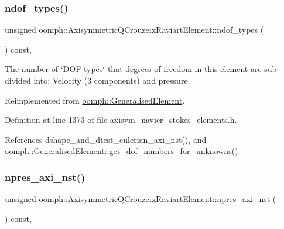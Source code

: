 \subsubsection{\texorpdfstring{ndof\+\_\+types()}{ndof\_types()}}
{\footnotesize\ttfamily unsigned oomph\+::\+Axisymmetric\+Q\+Crouzeix\+Raviart\+Element\+::ndof\+\_\+types (\begin{DoxyParamCaption}{ }\end{DoxyParamCaption}) const\hspace{0.3cm}{\ttfamily [inline]}, {\ttfamily [virtual]}}



The number of \char`\"{}\+D\+O\+F types\char`\"{} that degrees of freedom in this element are sub-\/divided into\+: Velocity (3 components) and pressure. 



Reimplemented from \hyperlink{classoomph_1_1GeneralisedElement_a0c6037a870597b35dcf1c780710b9a56}{oomph\+::\+Generalised\+Element}.



Definition at line 1373 of file axisym\+\_\+navier\+\_\+stokes\+\_\+elements.\+h.



References dshape\+\_\+and\+\_\+dtest\+\_\+eulerian\+\_\+axi\+\_\+nst(), and oomph\+::\+Generalised\+Element\+::get\+\_\+dof\+\_\+numbers\+\_\+for\+\_\+unknowns().

\mbox{\label{classoomph_1_1AxisymmetricQCrouzeixRaviartElement_a923c2ccbc5bd523118273e63cc18fd5f}} 
\subsubsection{\texorpdfstring{npres\+\_\+axi\+\_\+nst()}{npres\_axi\_nst()}}
{\footnotesize\ttfamily unsigned oomph\+::\+Axisymmetric\+Q\+Crouzeix\+Raviart\+Element\+::npres\+\_\+axi\+\_\+nst (\begin{DoxyParamCaption}{ }\end{DoxyParamCaption}) const\hspace{0.3cm}{\ttfamily [inline]}, {\ttfamily [virtual]}}



